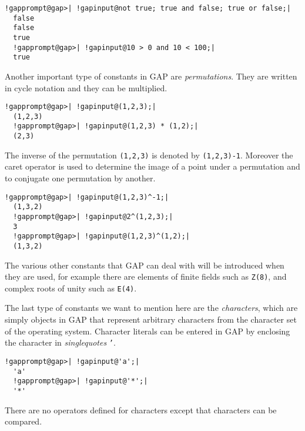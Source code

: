 \documentclass[a4paper,11pt]{report}
\begin{document}
{{ 
\begin{Verbatim}[commandchars=!@|,fontsize=\small,frame=single,label=Example]
  !gapprompt@gap>| !gapinput@not true; true and false; true or false;|
  false
  false
  true
  !gapprompt@gap>| !gapinput@10 > 0 and 10 < 100;|
  true
\end{Verbatim}
 

 Another important type of constants in \textsf{GAP} are \emph{permutations}. They are written in cycle notation and they can be multiplied. 

 
\begin{Verbatim}[commandchars=!@|,fontsize=\small,frame=single,label=Example]
  !gapprompt@gap>| !gapinput@(1,2,3);|
  (1,2,3)
  !gapprompt@gap>| !gapinput@(1,2,3) * (1,2);|
  (2,3)
\end{Verbatim}
 

 The inverse of the permutation \texttt{(1,2,3)} is denoted by \texttt{(1,2,3)\texttt{}-1}. Moreover the caret operator \texttt{\texttt{}} is used to determine the image of a point under a permutation and to conjugate
one permutation by another. 

 
\begin{Verbatim}[commandchars=!@|,fontsize=\small,frame=single,label=Example]
  !gapprompt@gap>| !gapinput@(1,2,3)^-1;|
  (1,3,2)
  !gapprompt@gap>| !gapinput@2^(1,2,3);|
  3
  !gapprompt@gap>| !gapinput@(1,2,3)^(1,2);|
  (1,3,2)
\end{Verbatim}
 

 The various other constants that \textsf{GAP} can deal with will be introduced when they are used, for example there are
elements of finite fields such as \texttt{Z(8)}, and complex roots of unity such as \texttt{E(4)}. 

 The last type of constants we want to mention here are the \emph{characters}, which are simply objects in \textsf{GAP} that represent arbitrary characters from the character set of the operating
system. Character literals can be entered in \textsf{GAP} by enclosing the character in \emph{singlequotes} \texttt{'}. 

 
\begin{Verbatim}[commandchars=!@|,fontsize=\small,frame=single,label=Example]
  !gapprompt@gap>| !gapinput@'a';|
  'a'
  !gapprompt@gap>| !gapinput@'*';|
  '*'
\end{Verbatim}
 

 There are no operators defined for characters except that characters can be
compared. 

}}
\end{document}
